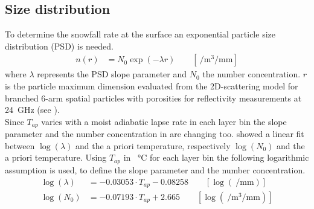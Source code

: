 \subsection{Size distribution} \label{sec:size_dist}
To determine the snowfall rate at the surface an exponential particle size distribution (PSD) is needed. 
\begin{align}
	n(r) & = N_{0} \exp\left(-\lambda r\right) \qquad [ \SI{}{\per\cubic\metre\per\mm} ] \label{eq:num_dens}
\end{align}
where $\lambda$ represents the PSD slope parameter and $N_{0}$ the number concentration. $r$ is the particle maximum dimension evaluated from the 2D-scattering model for branched 6-arm spatial particles with porosities for reflectivity measurements at \SI{24}{\giga\Hz} (see ).
\\
Since $T_{ap}$ varies with a moist adiabatic lapse rate in each layer bin the slope parameter and the number concentration in  are changing too. \citet{wood_estimation_2011} showed a linear fit between $\log(\lambda)$ and the a priori temperature, respectively $\log(N_0)$ and the a priori temperature.
Using $T_{ap}$ in \SI{}{\celsius} for each layer bin the following logarithmic assumption is used, to define the slope parameter and the number concentration.
\begin{align}
	\log(\lambda) & = -0.03053 \cdot T_{ap} - 0.08258  \label{eq:lambda} \qquad [ \log(\SI{}{\per\mm}) ]\\
	\log(N_0) & = -0.07193 \cdot T_{ap} +2.665  \qquad [ \log(\SI{}{\per\cubic\metre\per\mm})]
	\label{eq:N0}
\end{align}
